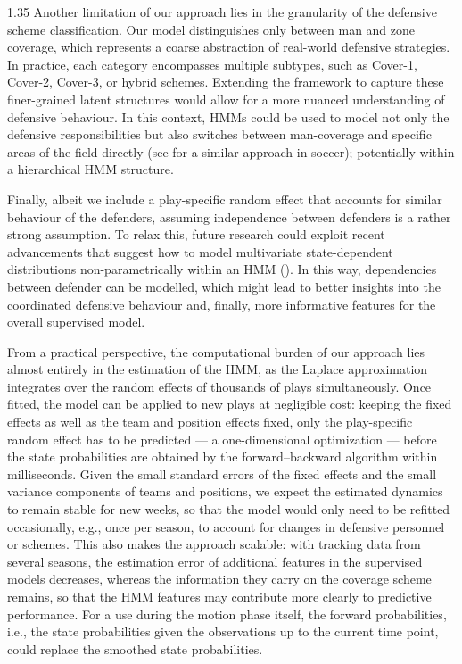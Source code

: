 \documentclass[12pt,a4paper]{article}
\begin{document}
\begin{spacing}{1.35}
Another limitation of our approach lies in the granularity of the defensive scheme classification. Our model distinguishes only between man and zone coverage, which represents a coarse abstraction of real-world defensive strategies. In practice, each category encompasses multiple subtypes, such as Cover-1, Cover-2, Cover-3, or hybrid schemes. Extending the framework to capture these finer-grained latent structures would allow for a more nuanced understanding of defensive behaviour. In this context, HMMs could be used to model not only the defensive responsibilities but also switches between man-coverage and specific areas of the field directly (see \citealp{groom} for a similar approach in soccer); potentially within a hierarchical HMM structure.

Finally, albeit we include a play-specific random effect that accounts for similar behaviour of the defenders, assuming independence between defenders is a rather strong assumption. To relax this, future research could exploit recent advancements that suggest how to model multivariate state-dependent distributions non-parametrically within an HMM (\citealp{koslik2025tensor, michels2025nonparametric}). In this way, dependencies between defender can be modelled, which might lead to better insights into the coordinated defensive behaviour and, finally, more informative features for the overall supervised model.

From a practical perspective, the computational burden of our approach lies almost entirely in the estimation of the HMM, as the Laplace approximation integrates over the random effects of thousands of plays simultaneously. Once fitted, the model can be applied to new plays at negligible cost: keeping the fixed effects as well as the team and position effects fixed, only the play-specific random effect has to be predicted --- a one-dimensional optimization --- before the state probabilities are obtained by the forward--backward algorithm within milliseconds. Given the small standard errors of the fixed effects and the small variance components of teams and positions, we expect the estimated dynamics to remain stable for new weeks, so that the model would only need to be refitted occasionally, e.g., once per season, to account for changes in defensive personnel or schemes. This also makes the approach scalable: with tracking data from several seasons, the estimation error of additional features in the supervised models decreases, whereas the information they carry on the coverage scheme remains, so that the HMM features may contribute more clearly to predictive performance. For a use during the motion phase itself, the forward probabilities, i.e., the state probabilities given the observations up to the current time point, could replace the smoothed state probabilities.


\end{spacing}
\end{document}
